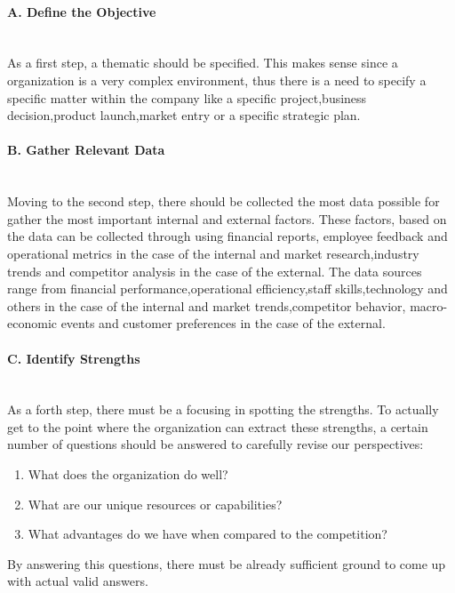 \paragraph{A. Define the Objective}\mbox{}\\
As a first step, a thematic should be specified. This makes sense since a organization is a very complex environment, thus there is a need to specify a specific matter within the company like a specific project,business decision,product launch,market entry or a specific strategic plan.

\paragraph{B. Gather Relevant Data}\mbox{}\\
Moving to the second step, there should be collected the most data possible for gather the most important internal and external factors. These factors, based on the data can be collected through using financial reports, employee feedback and operational metrics in the case of the internal and market research,industry trends and competitor analysis in the case of the external. The data sources range from financial performance,operational efficiency,staff skills,technology and others in the case of the internal and market trends,competitor behavior, macro-economic events and customer preferences in the case of the external.

\paragraph{C. Identify Strengths}\mbox{}\\
As a forth step, there must be a focusing in spotting the strengths. To actually get to the point where the organization can extract these strengths, a certain number of questions should be answered to carefully revise our perspectives:
\begin{enumerate}
    \item What does the organization do well?
    \item What are our unique resources or capabilities?
    \item What advantages do we have when compared to the competition?
\end{enumerate}
By answering this questions, there must be already sufficient ground to come up with actual valid answers.

